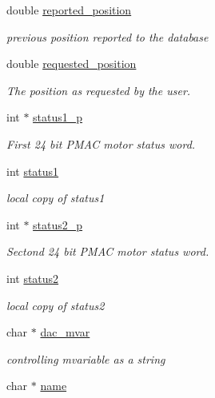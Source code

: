 \begin{DoxyCompactItemize}
double \hyperlink{structlspmac__motor__struct_ae5f1f605a0f587500e627332ad4e5e7e}{reported\-\_\-position}
\begin{DoxyCompactList}\small\item\em previous position reported to the database \end{DoxyCompactList}\item 
double \hyperlink{structlspmac__motor__struct_af8cdc94c6e2478b12ce942d4cf1d7499}{requested\-\_\-position}
\begin{DoxyCompactList}\small\item\em The position as requested by the user. \end{DoxyCompactList}\item 
int $\ast$ \hyperlink{structlspmac__motor__struct_a56c41875faf19c643e97c10519e6eb8c}{status1\-\_\-p}
\begin{DoxyCompactList}\small\item\em First 24 bit P\-M\-A\-C motor status word. \end{DoxyCompactList}\item 
int \hyperlink{structlspmac__motor__struct_acb52b612b9237e8eec0b97fb1e76a35d}{status1}
\begin{DoxyCompactList}\small\item\em local copy of status1 \end{DoxyCompactList}\item 
int $\ast$ \hyperlink{structlspmac__motor__struct_a2b33ef6e12717459c1e9967cc6e659c6}{status2\-\_\-p}
\begin{DoxyCompactList}\small\item\em Sectond 24 bit P\-M\-A\-C motor status word. \end{DoxyCompactList}\item 
int \hyperlink{structlspmac__motor__struct_a6a412224c09268c1dc92de9c2a1a2512}{status2}
\begin{DoxyCompactList}\small\item\em local copy of status2 \end{DoxyCompactList}\item 
char $\ast$ \hyperlink{structlspmac__motor__struct_a05dff021221abbc1bf656039fffb3275}{dac\-\_\-mvar}
\begin{DoxyCompactList}\small\item\em controlling mvariable as a string \end{DoxyCompactList}\item 
char $\ast$ \hyperlink{structlspmac__motor__struct_aa90af2f6f1489f1befe1d0891e51575a}{name}

\end{DoxyCompactItemize}
